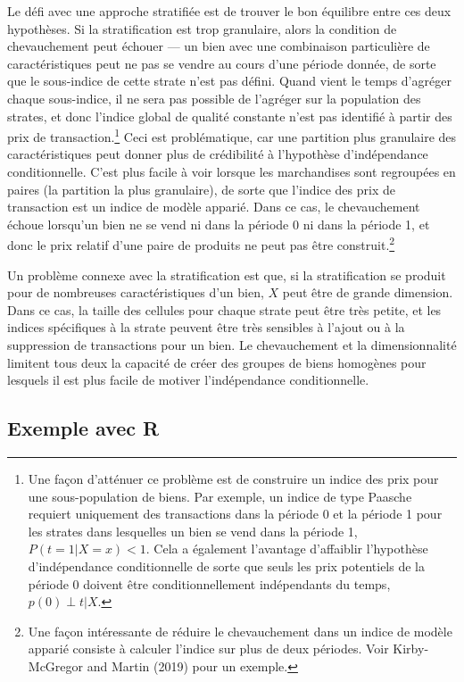 \documentclass[]{article}
\begin{document}
Le défi avec une approche stratifiée est de trouver le bon équilibre entre ces deux hypothèses. Si la stratification est trop granulaire, alors la condition de chevauchement peut échouer --- un bien avec une combinaison particulière de caractéristiques peut ne pas se vendre au cours d'une période donnée, de sorte que le sous-indice de cette strate n'est pas défini. Quand vient le temps d'agréger chaque sous-indice, il ne sera pas possible de l'agréger sur la population des strates, et donc l'indice global de qualité constante n'est pas identifié à partir des prix de transaction.\footnote{Une façon d'atténuer ce problème est de construire un indice des prix pour une sous-population de biens. Par exemple, un indice de type Paasche requiert uniquement des transactions dans la période 0 et la période 1 pour les strates dans lesquelles un bien se vend dans la période 1, \(P (t = 1 | X = x) <1\). Cela a également l'avantage d'affaiblir l'hypothèse d'indépendance conditionnelle de sorte que seuls les prix potentiels de la période 0 doivent être conditionnellement indépendants du temps, \(p(0)\perp t | X\).} Ceci est problématique, car une partition plus granulaire des caractéristiques peut donner plus de crédibilité à l'hypothèse d'indépendance conditionnelle. C'est plus facile à voir lorsque les marchandises sont regroupées en paires (la partition la plus granulaire), de sorte que l'indice des prix de transaction est un indice de modèle apparié. Dans ce cas, le chevauchement échoue lorsqu'un bien ne se vend ni dans la période 0 ni dans la période 1, et donc le prix relatif d'une paire de produits ne peut pas être construit.\footnote{Une façon intéressante de réduire le chevauchement dans un indice de modèle apparié consiste à calculer l'indice sur plus de deux périodes. Voir Kirby-McGregor and Martin (2019) pour un exemple.}

Un problème connexe avec la stratification est que, si la stratification se produit pour de nombreuses caractéristiques d'un bien, \(X\) peut être de grande dimension. Dans ce cas, la taille des cellules pour chaque strate peut être très petite, et les indices spécifiques à la strate peuvent être très sensibles à l'ajout ou à la suppression de transactions pour un bien. Le chevauchement et la dimensionnalité limitent tous deux la capacité de créer des groupes de biens homogènes pour lesquels il est plus facile de motiver l'indépendance conditionnelle.

\hypertarget{exemple-avec-r-2}{%
\subsection{Exemple avec R}\label{exemple-avec-r-2}}
\end{document}
